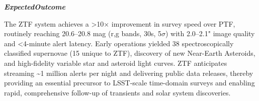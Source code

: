 \begin{tcolorbox}[
    breakable,
    title={Example of Idea Generation in Astronomy},
    colback=LighterGray,
    colframe=DeepPurple,
    colbacktitle=DeepPurple,
    coltitle=White,
]
\textbf{\emph{\textcolor{CaseOrange}{ExpectedOutcome}}}

The ZTF system achieves a >10× improvement in survey speed over PTF, routinely reaching 20.6–20.8
mag (r,g bands, 30s, 5$\sigma$) with 2.0–2.1" image quality and <4-minute alert latency. Early operations
yielded 38 spectroscopically classified supernovae (15 unique to ZTF), discovery of new Near-Earth
Asteroids, and high-fidelity variable star and asteroid light curves. ZTF anticipates streaming
\~{}1 million alerts per night and delivering public data releases, thereby providing an essential
precursor to LSST-scale time-domain surveys and enabling rapid, comprehensive follow-up of
transients and solar system discoveries.

\end{tcolorbox}



